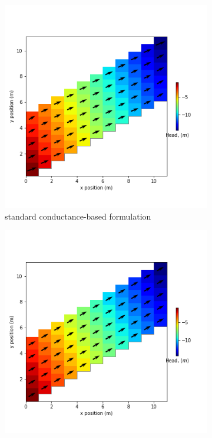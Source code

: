 \documentclass{article}
\begin{document}
\begin{figure}[H]
\centering
\begin{subfigure}{0.4\textwidth}
	\includegraphics[width=\textwidth]{../figures/disu-af-vs-s-head.png}
	\caption{standard conductance-based formulation}
	\label{fig:disu-s-cc-head}
\end{subfigure}
\hfill
\begin{subfigure}{0.4\textwidth}
	\includegraphics[width=\textwidth]{../figures/disu-af-vs-x-head.png}

\end{subfigure}
\end{figure}
\end{document}
